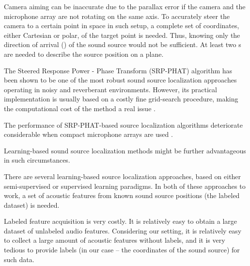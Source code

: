 \documentclass[applsci,article,submit,moreauthors,pdftex]{Definitions/mdpi}
\begin{document}
Camera aiming can be inaccurate due to the parallax error if the camera and the microphone array are not rotating on the same axis. To accurately steer the camera to a certain point in space in such setup, a complete set of coordinates, either Cartesian or polar, of the target point is needed.
Thus, knowing only the direction of arrival (\doa{}) of the sound source would not be sufficient. At least two \doa{}s are needed to describe the source position on a plane.


The Steered Response Power - Phase Transform (SRP-PHAT) algorithm has been shown to be one of the most robust sound source localization approaches operating in noisy and reverberant environments. However, its practical implementation is usually based on a costly fine grid-search procedure, making the computational cost of the method a real issue \cite{martiSpeakerLocalizationDetection2011}.  

The performance of SRP-PHAT-based source localization algorithms deteriorate considerable when compact microphone arrays are used \cite{}.

Learning-based sound source localization methods might be further advantageous in such circumstances. 

There are several learning-based source localization approaches, based on either semi-supervised \cite{laufer-goldshteinSemiSupervisedSoundSource2016} or supervised \cite{heDeepNeuralNetworks2018b,heAdaptationMultipleSound2019} learning paradigms. In both of these approaches to work, a set of acoustic features from known sound source positions (the labeled dataset) is needed. 

Labeled feature acquisition is very costly.
It is relatively easy to obtain a large dataset of unlabeled audio features. 
Considering our setting, it is relatively easy to collect a large amount of acoustic features without labels, and it is very tedious to provide labels (in our case -- the coordinates of the sound source) for such data. 

\end{document}
